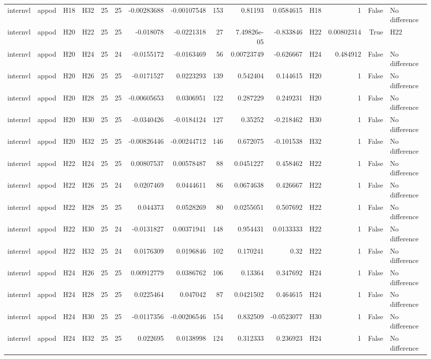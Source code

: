 \begin{longtable}{llllrrrrrrrlrrl}
internvl & appod & H18 & H32 & 25 & 25 & -0.00283688 & -0.00107548 & 153 & 0.81193 & 0.0584615 & H18 & 1 & False & No difference \\
internvl & appod & H20 & H22 & 25 & 25 & -0.018078 & -0.0221318 & 27 & 7.49826e-05 & -0.833846 & H22 & 0.00802314 & True & H22 \\
internvl & appod & H20 & H24 & 25 & 24 & -0.0155172 & -0.0163469 & 56 & 0.00723749 & -0.626667 & H24 & 0.484912 & False & No difference \\
internvl & appod & H20 & H26 & 25 & 25 & -0.0171527 & 0.0223293 & 139 & 0.542404 & 0.144615 & H20 & 1 & False & No difference \\
internvl & appod & H20 & H28 & 25 & 25 & -0.00605653 & 0.0306951 & 122 & 0.287229 & 0.249231 & H20 & 1 & False & No difference \\
internvl & appod & H20 & H30 & 25 & 25 & -0.0340426 & -0.0184124 & 127 & 0.35252 & -0.218462 & H30 & 1 & False & No difference \\
internvl & appod & H20 & H32 & 25 & 25 & -0.00826446 & -0.00244712 & 146 & 0.672075 & -0.101538 & H32 & 1 & False & No difference \\
internvl & appod & H22 & H24 & 25 & 25 & 0.00807537 & 0.00578487 & 88 & 0.0451227 & 0.458462 & H22 & 1 & False & No difference \\
internvl & appod & H22 & H26 & 25 & 24 & 0.0207469 & 0.0444611 & 86 & 0.0674638 & 0.426667 & H22 & 1 & False & No difference \\
internvl & appod & H22 & H28 & 25 & 25 & 0.044373 & 0.0528269 & 80 & 0.0255051 & 0.507692 & H22 & 1 & False & No difference \\
internvl & appod & H22 & H30 & 25 & 24 & -0.0131827 & 0.00371941 & 148 & 0.954431 & 0.0133333 & H22 & 1 & False & No difference \\
internvl & appod & H22 & H32 & 25 & 24 & 0.0176309 & 0.0196846 & 102 & 0.170241 & 0.32 & H22 & 1 & False & No difference \\
internvl & appod & H24 & H26 & 25 & 25 & 0.00912779 & 0.0386762 & 106 & 0.13364 & 0.347692 & H24 & 1 & False & No difference \\
internvl & appod & H24 & H28 & 25 & 25 & 0.0225464 & 0.047042 & 87 & 0.0421502 & 0.464615 & H24 & 1 & False & No difference \\
internvl & appod & H24 & H30 & 25 & 25 & -0.0117356 & -0.00206546 & 154 & 0.832509 & -0.0523077 & H30 & 1 & False & No difference \\
internvl & appod & H24 & H32 & 25 & 25 & 0.022695 & 0.0138998 & 124 & 0.312333 & 0.236923 & H24 & 1 & False & No difference \\

\end{longtable}
